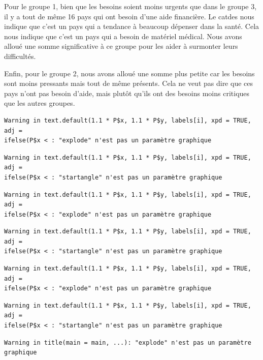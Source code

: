 \documentclass[
]{article}
\begin{document}
Pour le groupe 1, bien que les besoins soient moins urgents que dans le
groupe 3, il y a tout de même 16 pays qui ont besoin d'une aide
financière. Le catdes nous indique que c'est un pays qui a tendance à
beaucoup dépenser dans la santé. Cela nous indique que c'est un pays qui
a besoin de matériel médical. Nous avons alloué une somme significative
à ce groupe pour les aider à surmonter leurs difficultés.

Enfin, pour le groupe 2, nous avons alloué une somme plus petite car les
besoins sont moins pressants mais tout de même présents. Cela ne veut
pas dire que ces pays n'ont pas besoin d'aide, mais plutôt qu'ils ont
des besoins moins critiques que les autres groupes.

\begin{verbatim}
Warning in text.default(1.1 * P$x, 1.1 * P$y, labels[i], xpd = TRUE, adj =
ifelse(P$x < : "explode" n'est pas un paramètre graphique
\end{verbatim}

\begin{verbatim}
Warning in text.default(1.1 * P$x, 1.1 * P$y, labels[i], xpd = TRUE, adj =
ifelse(P$x < : "startangle" n'est pas un paramètre graphique
\end{verbatim}

\begin{verbatim}
Warning in text.default(1.1 * P$x, 1.1 * P$y, labels[i], xpd = TRUE, adj =
ifelse(P$x < : "explode" n'est pas un paramètre graphique
\end{verbatim}

\begin{verbatim}
Warning in text.default(1.1 * P$x, 1.1 * P$y, labels[i], xpd = TRUE, adj =
ifelse(P$x < : "startangle" n'est pas un paramètre graphique
\end{verbatim}

\begin{verbatim}
Warning in text.default(1.1 * P$x, 1.1 * P$y, labels[i], xpd = TRUE, adj =
ifelse(P$x < : "explode" n'est pas un paramètre graphique
\end{verbatim}

\begin{verbatim}
Warning in text.default(1.1 * P$x, 1.1 * P$y, labels[i], xpd = TRUE, adj =
ifelse(P$x < : "startangle" n'est pas un paramètre graphique
\end{verbatim}

\begin{verbatim}
Warning in title(main = main, ...): "explode" n'est pas un paramètre graphique
\end{verbatim}
\end{document}
